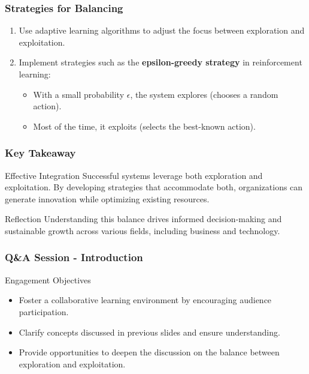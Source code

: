 \documentclass[aspectratio=169]{beamer}
\begin{document}
\begin{frame}[fragile]
    \frametitle{Strategies for Balancing}
    \begin{enumerate}
        \item Use adaptive learning algorithms to adjust the focus between exploration and exploitation.
        \item Implement strategies such as the \textbf{epsilon-greedy strategy} in reinforcement learning:
            \begin{itemize}
                \item With a small probability $\epsilon$, the system explores (chooses a random action).
                \item Most of the time, it exploits (selects the best-known action).
            \end{itemize}
    \end{enumerate}
\end{frame}

\begin{frame}[fragile]
    \frametitle{Key Takeaway}
    \begin{block}{Effective Integration}
        Successful systems leverage both exploration and exploitation. 
        By developing strategies that accommodate both, organizations can generate innovation while optimizing existing resources.
    \end{block}
    \begin{block}{Reflection}
        Understanding this balance drives informed decision-making and sustainable growth across various fields, including business and technology.
    \end{block}
\end{frame}

\begin{frame}[fragile]
    \frametitle{Q\&A Session - Introduction}
    \begin{block}{Engagement Objectives}
        \begin{itemize}
            \item Foster a collaborative learning environment by encouraging audience participation.
            \item Clarify concepts discussed in previous slides and ensure understanding.
            \item Provide opportunities to deepen the discussion on the balance between exploration and exploitation.
        \end{itemize}
    \end{block}
\end{frame}
\end{document}

